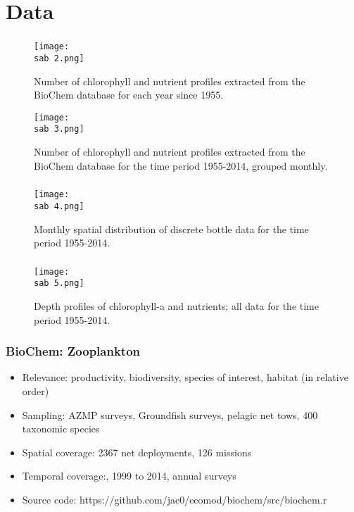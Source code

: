 \documentclass{beamer}
\numberwithin{equation}{section}		%
\numberwithin{figure}{section}		%
\numberwithin{table}{section}				%
\newcommand{\ecomod}{\string~/ecomod_data/}   %
\newcommand{\sab}{\ecomod/mpa/sab/}   %
\begin{document}
\section{Data}
\begin{frame}
  \frametitle{}
      \begin{figure}
        \centering
        \texttt{[image: \\sab 2.png]}
        \caption{Number of chlorophyll and nutrient profiles extracted from the BioChem database for each year since 1955.}
        \label{fig:ChloroMap}
      \end{figure}
      \begin{figure}
        \centering
        \texttt{[image: \\sab 3.png]}
        \caption{Number of chlorophyll and nutrient profiles extracted from the BioChem database for the time period 1955-2014, grouped monthly.}
        \label{fig:ChloroFreq}
      \end{figure}
\end{frame}



\begin{frame}[shrink]
  \frametitle{}
  \begin{figure}
    \centering
    \texttt{[image: \\sab 4.png]}
    \caption{Monthly spatial distribution of discrete bottle data for the time period 1955-2014.}
    \label{fig:BottleMap}
  \end{figure}
\end{frame}



\begin{frame}
  \frametitle{}
  \begin{figure}
    \centering
    \texttt{[image: \\sab 5.png]}
    \caption{Depth profiles of chlorophyll-a and nutrients; all data for the time period 1955-2014.}
    \label{fig:ChloroProfiles}
  \end{figure}
\end{frame}




\begin{frame}
  \frametitle{BioChem: Zooplankton}
  \begin{itemize}  
    \item Relevance:  productivity, biodiversity, species of interest, habitat (in relative order)
    \item Sampling:  AZMP surveys, Groundfish surveys, pelagic net tows, 400 taxonomic species
    \item Spatial coverage: 2367 net deployments, 126 missions 
    \item Temporal coverage:,  1999 to 2014, annual surveys
    \item Source code: https://github.com/jae0/ecomod/biochem/src/biochem.r
  \end{itemize}
\end{frame}
\end{document}
